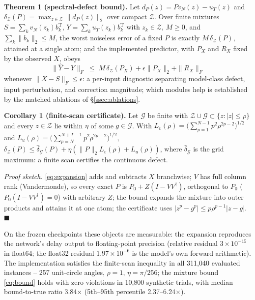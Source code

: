 \documentclass{article}
\begin{document}
\textbf{Theorem 1 (spectral-defect bound).} Let
$d_P(z)=Pv_N(z)-u_T(z)$ and
$\delta_{\mathcal Z}(P)=\max_{z\in\mathcal Z}\|d_P(z)\|_2$ over compact
$\mathcal Z$. Over finite mixtures
$S=\sum_kv_N(z_k)b_k^{\mathrm T}$,
$Y=\sum_ku_T(z_k)b_k^{\mathrm T}$ with $z_k\in\mathcal Z$, $M\ge0$, and
$\sum_k\|b_k\|_2\le M$, the worst
noiseless error of a fixed $P$ is exactly $M\,\delta_{\mathcal Z}(P)$,
attained at a single atom; and the implemented predictor, with $P_X$ and
$R_X$ fixed by the observed $X$, obeys
\begin{equation}
\|\widehat Y-Y\|_F\;\le\;M\,\delta_{\mathcal Z}(P_X)
+\epsilon\|P_X\|_2+\|R_X\|_F
\label{eq:bound}
\end{equation}
whenever $\|X-S\|_F\le\epsilon$: a per-input diagnostic separating
model-class defect, input perturbation, and correction magnitude;
which modules help is established by the matched ablations of
\S\ref{ssec:ablations}.

\textbf{Corollary 1 (finite-scan certificate).} Let
$\mathcal G$ be finite with
$\mathcal Z\cup\mathcal G\subset\{z:|z|\le\rho\}$ and every
$z\in\mathcal Z$ lie within $\eta$ of some $g\in\mathcal G$. With
$L_v(\rho)=\big(\sum_{p=1}^{N-1}p^2\rho^{2p-2}\big)^{1/2}$ and
$L_u(\rho)=\big(\sum_{p=N}^{N+T-1}p^2\rho^{2p-2}\big)^{1/2}$,
$\delta_{\mathcal Z}(P)\le\widehat\delta_{\mathcal G}(P)
+\eta(\|P\|_2L_v(\rho) + L_u(\rho))$, where $\widehat\delta_{\mathcal G}$
is the grid maximum: a finite scan certifies the continuous defect.

\emph{Proof sketch.} \eqref{eq:expansion} adds and subtracts $X$
branchwise; $V$ has full column rank (Vandermonde), so every exact $P$
is $P_0+Z(I{-}VV^{\dagger})$, orthogonal to $P_0$
($P_0(I{-}VV^{\dagger})=0$) with arbitrary $Z$; the bound expands
the mixture into outer products and attains it at one atom; the
certificate uses $|z^p-g^p|\le p\rho^{p-1}|z-g|$.~$\blacksquare$

On the frozen checkpoints these objects are measurable: the expansion
reproduces the network's delay output to floating-point precision
(relative residual $3\times10^{-15}$ in float64; the float32 residual
$1.97\times10^{-6}$ is the model's own forward arithmetic). The
implementation satisfies the finite-scan inequality in all 311{,}040
evaluated instances -- 257 unit-circle angles, $\rho{=}1$,
$\eta{=}\pi/256$; the mixture bound \eqref{eq:bound} holds with zero
violations in 10{,}800 synthetic trials, with median bound-to-true
ratio 3.84$\times$ (5th--95th percentile 2.37--6.24$\times$).
\end{document}
